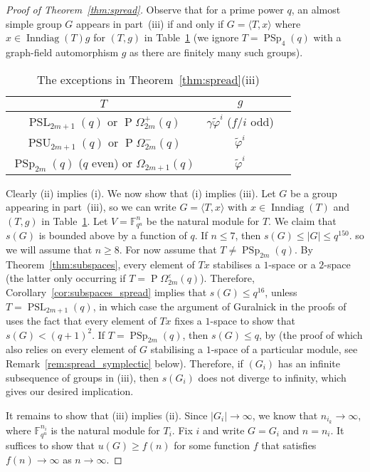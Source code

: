 \documentclass[11pt]{article}
\numberwithin{equation}{section}
\theoremstyle{shdefinition}
\theoremstyle{shplain}
\newcommand{\g}{\gamma}
\newcommand{\e}{\varepsilon}
\renewcommand{\wp}{\widetilde{\varphi}}
\newcommand{\<}{\langle}
\renewcommand{\>}{\rangle}
\renewcommand{\leq}{\leqslant}
\renewcommand{\geq}{\geqslant}
\newcommand{\Inndiag}{\operatorname{Inndiag}}
\newcommand{\F}{\mathbb{F}}
\renewcommand{\:}{\colon}
\newcommand{\PSL}{\operatorname{PSL}}
\newcommand{\PSp}{\operatorname{PSp}}
\newcommand{\PSU}{\operatorname{PSU}}
\newcommand{\Om}{\Omega}
\newcommand{\POm}{\operatorname{P}\!\Om}
\begin{document}
\begin{proof}[Proof of Theorem~\ref{thm:spread}]
Observe that for a prime power $q$, an almost simple group $G$ appears in part~(iii) if and only if $G = \<T,x\>$ where $x \in \Inndiag(T)g$ for $(T,g)$ in Table~\ref{tab:spread} (we ignore $T = \PSp_4(q)$ with a graph-field automorphism $g$ as there are finitely many such groups).

\begin{table}
\centering 
\caption{The exceptions in Theorem~\ref{thm:spread}(iii)} \label{tab:spread}
\begin{tabular}{ccc} 
\hline
$T$                                          & $g$                   \\
\hline
$\PSL_{2m+1}(q)$ or $\POm^+_{2m}(q)$         & $\g\wp^i$ ($f/i$ odd) \\
$\PSU_{2m+1}(q)$ or $\POm^-_{2m}(q)$         & $\wp^i$               \\
$\PSp_{2m}(q)$ ($q$ even) or $\Om_{2m+1}(q)$ & $\wp^i$               \\
\hline
\end{tabular}
\end{table}

Clearly (ii) implies (i). We now show that (i) implies (iii). Let $G$ be a group appearing in part~(iii), so we can write $G = \< T, x\>$ with $x \in \Inndiag(T)$ and $(T,g)$ in Table~\ref{tab:spread}. Let $V = \F_{q^u}^n$ be the natural module for $T$. We claim that $s(G)$ is bounded above by a function of $q$. If $n \leq 7$, then $s(G) \leq |G| \leq q^{150}$. so we will assume that $n \geq 8$. For now assume that $T \neq \PSp_{2m}(q)$. By Theorem~\ref{thm:subspaces}, every element of $Tx$ stabilises a $1$-space or a $2$-space (the latter only occurring if $T = \POm^\e_{2m}(q)$). Therefore, Corollary~\ref{cor:subspaces_spread} implies that $s(G) \leq q^{16}$, unless $T = \PSL_{2m+1}(q)$, in which case the argument of Guralnick in the proofs of \cite[Propositions~5.8 and~6.4]{ref:BurnessGuest13} uses the fact that every element of $Tx$ fixes a $1$-space to show that $s(G) < (q+1)^2$. If $T = \PSp_{2m}(q)$, then $s(G) \leq q$, by \cite[Theorem~4]{ref:Harper17} (the proof of which also relies on every element of $G$ stabilising a $1$-space of a particular module, see Remark~\ref{rem:spread_symplectic} below). Therefore, if $(G_i)$ has an infinite subsequence of groups in (iii), then $s(G_i)$ does not diverge to infinity, which gives our desired implication. 

It remains to show that (iii) implies (ii). Since $|G_i| \to \infty$, we know that $n_{i_k} \to \infty$, where $\F_{q^u}^{n_i}$ is the natural module for $T_i$. Fix $i$ and write $G = G_i$ and $n = n_i$. It suffices to show that $u(G) \geq f(n)$ for some function $f$ that satisfies $f(n) \to \infty$ as $n \to \infty$. 


\end{proof}
\end{document}
